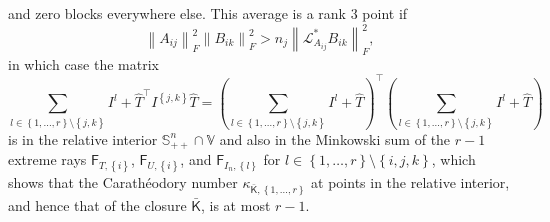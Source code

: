\documentclass[oneside]{amsart}
\theoremstyle{plain}
\theoremstyle{definition}
\theoremstyle{remark}
\numberwithin{equation}{section}
\begin{document}
and zero blocks everywhere else. This average is a rank $3$ point if
\[
\left\lVert A_{ij}\right\rVert_{F}^{2} \left\lVert
B_{ik}\right\rVert_{F}^{2} > n_{j} \left\lVert \mathcal{L}^{*}_{A_{ij}}
B_{ik}\right\rVert_{F}^{2},
\]
in which case the matrix
\[
\sum_{l \in \left\{1, \dots, r\right\} \setminus \left\{j,k\right\}} I^{l}
+ \hat{T}^{\top} I^{\left\{j,k\right\}} \hat{T} = \left( \sum_{l \in
\left\{1, \dots, r\right\} \setminus \left\{j,k\right\}} I^{l} + \hat{T}
\right)^{\top} \left( \sum_{l \in \left\{1, \dots, r\right\} \setminus
\left\{j,k\right\}} I^{l} + \hat{T} \right)
\]
is in the relative interior $\mathbb{S}^{n}_{++} \cap \mathbb{V}$ and also
in the Minkowski sum of the $r-1$ extreme rays
$\mathsf{F}_{T,\left\{i\right\}}$, $\mathsf{F}_{U,\left\{i\right\}}$, and
$\mathsf{F}_{I_{n},\left\{l\right\}}$ for $l \in \left\{1, \dots, r\right\}
\setminus \left\{i,j,k\right\}$, which shows that the Carath\'eodory number
$\kappa_{\bar{\mathsf{K}},\left\{1, \dotsc, r\right\}}$ at points in the
relative interior, and hence that of the closure $\bar{\mathsf{K}}$, is at
most $r-1$.
\end{document}
